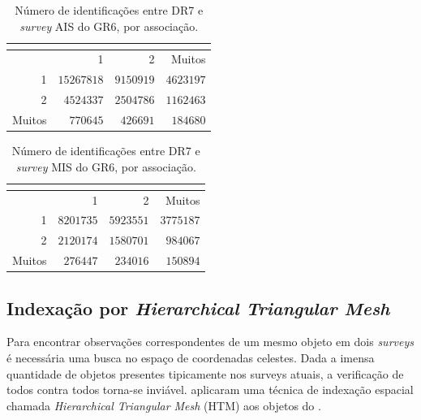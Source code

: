 \begin{table}
	\caption[Número de identificações entre \SDSS DR7 e {\em survey} AIS do \galex
	GR6, por associação.]
	{Número de identificações entre \SDSS DR7 e {\em survey} AIS do \galex GR6, por
	associação.}
	\setlength{\tabcolsep}{1cm}
	\begin{tabular}{r r r r}
	\galex &          \multicolumn{3}{c}{\SDSS} \\
	\midrule
	       &          1 &         2 &    Muitos \\
	1      & $15267818$ & $9150919$ & $4623197$ \\
	2      &  $4524337$ & $2504786$ & $1162463$ \\
	Muitos &   $770645$ &  $426691$ &  $184680$ \\
	\end{tabular}
	\label{tab:SDSSxGalexMatchesAIS}
\end{table}

\begin{table}
	\caption[Número de identificações entre \SDSS DR7 e {\em survey} AIS do \galex
	GR6, por associação.]
	{Número de identificações entre \SDSS DR7 e {\em survey} MIS do \galex GR6, por
	associação.}
	\setlength{\tabcolsep}{1cm}
	\begin{tabular}{r r r r}
	\galex &         \multicolumn{3}{c}{\SDSS} \\
	\midrule
	       &         1 &        2 &     Muitos \\
	1      & $8201735$ & $5923551$ & $3775187$ \\
	2      & $2120174$ & $1580701$ &  $984067$ \\
	Muitos &  $276447$ &  $234016$ &  $150894$ \\
	\end{tabular}
	\label{tab:SDSSxGalexMatchesMIS}
\end{table}

\subsection{Indexação por {\em Hierarchical Triangular Mesh}}
\label{sec:Crossmatch:SDSSGalex:HTM}

Para encontrar observações correspondentes de um mesmo objeto em dois {\em
surveys} é necessária uma busca no espaço de coordenadas celestes. Dada a imensa
quantidade de objetos presentes tipicamente nos surveys atuais, a verificação de
todos contra todos torna-se inviável. \citet{Kunszt2000} aplicaram uma técnica
de indexação espacial chamada {\em Hierarchical Triangular Mesh} (HTM) aos
objetos do \SDSS.

